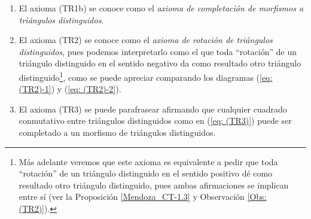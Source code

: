 \documentclass[tesis]{subfiles}
\begin{document}
\begin{Obs}\label{Obs: Categoría pretriangulada}\leavevmode

    \begin{enumerate}[label=(\arabic*)]
    
        \item El axioma (TR1b) se conoce como el \emph{axioma de completación de morfismos a triángulos distinguidos}.

        \item El axioma (TR2) se conoce como el \emph{axioma de rotación de triángulos distinguidos}, pues podemos interpretarlo como el que toda ``rotación'' de un triángulo distinguido en el sentido negativo da como resultado otro triángulo distinguido\footnote{Más adelante veremos que este axioma es equivalente a pedir que toda ``rotación'' de un triángulo distinguido en el sentido positivo dé como resultado otro triángulo distinguido, pues ambas afirmaciones se implican entre sí (ver la Proposición \ref{Mendoza_CT-1.3} y Observación \ref{Obs: (TR2)}).}, como se puede apreciar comparando los diagramas (\ref{eq: (TR2)-1}) y (\ref{eq: (TR2)-2}).

        \item El axioma (TR3) se puede parafrasear afirmando que cualquier cuadrado conmutativo entre triángulos distinguidos como en (\ref{eq: (TR3)}) puede ser completado a un morfismo de triángulos distinguidos. 


\end{enumerate}
\end{Obs}
\end{document}
